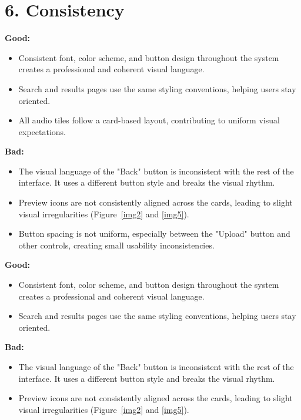\documentclass[12pt]{article}
\begin{document}
\section*{6. Consistency}

\textbf{Good:}
\begin{itemize}
    \item Consistent font, color scheme, and button design throughout the system creates a professional and coherent visual language.
    \item Search and results pages use the same styling conventions, helping users stay oriented.
    \item All audio tiles follow a card-based layout, contributing to uniform visual expectations.
\end{itemize}

\textbf{Bad:}
\begin{itemize}
    \item The visual language of the "Back" button is inconsistent with the rest of the interface. It uses a different button style and breaks the visual rhythm.
    \item Preview icons are not consistently aligned across the cards, leading to slight visual irregularities (Figure~\ref{img2} and \ref{img5}).
    \item Button spacing is not uniform, especially between the "Upload" button and other controls, creating small usability inconsistencies.
\end{itemize}


\textbf{Good:}
\begin{itemize}
    \item Consistent font, color scheme, and button design throughout the system creates a professional and coherent visual language.
    \item Search and results pages use the same styling conventions, helping users stay oriented.
\end{itemize}

\textbf{Bad:}
\begin{itemize}
    \item The visual language of the "Back" button is inconsistent with the rest of the interface. It uses a different button style and breaks the visual rhythm.
    \item Preview icons are not consistently aligned across the cards, leading to slight visual irregularities (Figure~\ref{img2} and \ref{img5}).
\end{itemize}
\end{document}
